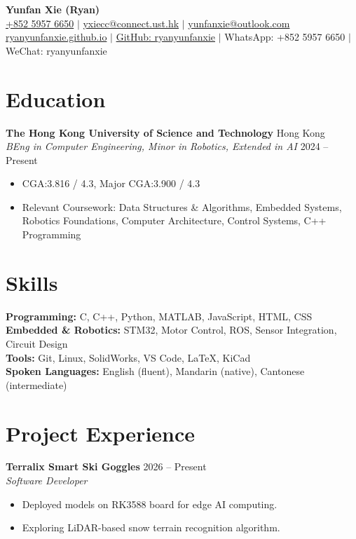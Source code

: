 \documentclass[a4paper,11pt]{article}
\begin{document}
\begin{center}
    {\LARGE \textbf{Yunfan Xie (Ryan)}} \\
    \href{tel:+85259576650}{+852 5957 6650} $\vert$ \href{mailto:yxiecc@connect.ust.hk}{yxiecc@connect.ust.hk} $\vert$ \href{mailto:yunfanxie@outlook.com}{yunfanxie@outlook.com} \\
    \href{https://ryanyunfanxie.github.io}{ryanyunfanxie.github.io} $\vert$ \href{https://github.com/ryanyunfanxie}{GitHub: ryanyunfanxie} $\vert$ {WhatsApp: +852 5957 6650} $\vert$ {WeChat: ryanyunfanxie}
\end{center}

\vspace{0.5em}

\section*{Education}
\textbf{The Hong Kong University of Science and Technology}  \hfill Hong Kong\\
\textit{BEng in Computer Engineering, Minor in Robotics, Extended in AI}  \hfill 2024 -- Present
\begin{itemize}[noitemsep, topsep=0pt]
    \item  CGA:\@ 3.816 / 4.3, Major CGA:\@ 3.900 / 4.3
    \item Relevant Coursework: Data Structures \& Algorithms, Embedded Systems, Robotics Foundations, Computer Architecture, Control Systems, C++ Programming
\end{itemize}


\section*{Skills}
\textbf{Programming:} C, C++, Python, MATLAB, JavaScript, HTML, CSS \\
\textbf{Embedded \& Robotics:} STM32, Motor Control, ROS, Sensor Integration, Circuit Design \\
\textbf{Tools:} Git, Linux, SolidWorks, VS Code, LaTeX, KiCad \\
\textbf{Spoken Languages:} English (fluent), Mandarin (native), Cantonese (intermediate)

\section*{Project Experience}
\textbf{Terralix Smart Ski Goggles} \hfill 2026 -- Present \\
\textit{Software Developer} 
\begin{itemize}[noitemsep, topsep=0pt]
    \item Deployed models on RK3588 board for edge AI computing. 
    \item Exploring LiDAR-based snow terrain recognition algorithm.
\end{itemize} 
\end{document}
